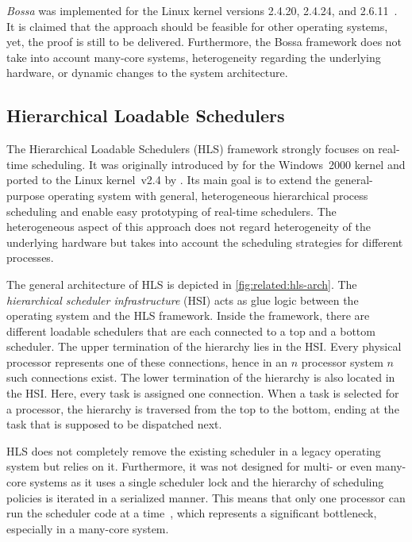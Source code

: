 \emph{Bossa} was implemented for the Linux kernel versions 2.4.20, 2.4.24, and 2.6.11~\cite{Bossa}. It is claimed that the approach should be feasible for other operating systems, yet, the proof is still to be delivered. Furthermore, the Bossa framework does not take into account many-core systems, heterogeneity regarding the underlying hardware, or dynamic changes to the system architecture.

\subsection{Hierarchical Loadable Schedulers}%
\label{sec:rw:hls}

The Hierarchical Loadable Schedulers (HLS) framework strongly focuses on real-time scheduling. It was originally introduced by \textcite{Regehr-2001-HLSPhD}\cite{Regehr-2001-HLS} for the Windows~2000 kernel and ported to the Linux kernel~v2.4 by \textcite{Abeni-2002-HLS}\cite{HLSonLinux}. Its main goal is to extend the general-purpose operating system with general, heterogeneous hierarchical process scheduling and enable easy prototyping of real-time schedulers. The heterogeneous aspect of this approach does not regard heterogeneity of the underlying hardware but takes into account the scheduling strategies for different processes.

The general architecture of HLS is depicted in \cref{fig:related:hls-arch}. The \emph{hierarchical scheduler infrastructure} (HSI) acts as glue logic between the operating system and the HLS framework. Inside the framework, there are different loadable schedulers that are each connected to a top and a bottom scheduler. The upper termination of the hierarchy lies in the HSI. Every physical processor represents one of these connections, hence in an \(n\) processor system \(n\) such connections exist. The lower termination of the hierarchy is also located in the HSI. Here, every task is assigned one connection. When a task is selected for a processor, the hierarchy is traversed from the top to the bottom, ending at the task that is supposed to be dispatched next.

HLS does not completely remove the existing scheduler in a legacy operating system but relies on it. Furthermore, it was not designed for multi- or even many-core systems as it uses a single scheduler lock and the hierarchy of scheduling policies is iterated in a serialized manner. This means that only one processor can run the scheduler code at a time~\cite[36\psq]{Regehr-2001-HLSPhD}, which represents a significant bottleneck, especially in a many-core system.

